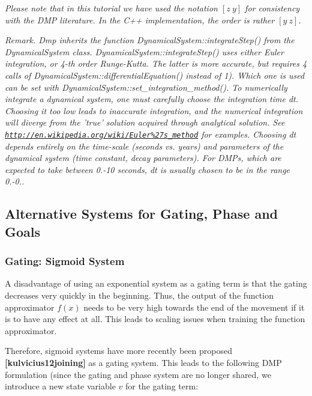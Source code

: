 {\itshape Please note that in this tutorial we have used the notation $[z~y]$ for consistency with the D\+M\+P literature. In the C++ implementation, the order is rather $[y~z]$.}

{\itshape {\itshape Remark}. Dmp inherits the function Dynamical\+System\+::integrate\+Step() from the Dynamical\+System class. Dynamical\+System\+::integrate\+Step() uses either Euler integration, or 4-\/th order Runge-\/\+Kutta. The latter is more accurate, but requires 4 calls of Dynamical\+System\+::differential\+Equation() instead of 1). Which one is used can be set with Dynamical\+System\+::set\+\_\+integration\+\_\+method(). To numerically integrate a dynamical system, one must carefully choose the integration time dt. Choosing it too low leads to inaccurate integration, and the numerical integration will diverge from the 'true' solution acquired through analytical solution. See \href{http://en.wikipedia.org/wiki/Euler%27s_method}{\tt http\+://en.\+wikipedia.\+org/wiki/\+Euler\%27s\+\_\+method} for examples. Choosing dt depends entirely on the time-\/scale (seconds vs. years) and parameters of the dynamical system (time constant, decay parameters). For D\+M\+Ps, which are expected to take between 0.\+5-\/10 seconds, dt is usually chosen to be in the range 0.\+01-\/0.\+001. }\hypertarget{page_dmp_sec_dmp_alternative}{}\subsection{Alternative Systems for Gating, Phase and Goals}\label{page_dmp_sec_dmp_alternative}
\hypertarget{page_dmp_sec_dmp_sigmoid_gating}{}\subsubsection{Gating\+: Sigmoid System}\label{page_dmp_sec_dmp_sigmoid_gating}
A disadvantage of using an exponential system as a gating term is that the gating decreases very quickly in the beginning. Thus, the output of the function approximator $ f(x) $ needs to be very high towards the end of the movement if it is to have any effect at all. This leads to scaling issues when training the function approximator.

Therefore, sigmoid systems have more recently been proposed {\bfseries [kulvicius12joining]} as a gating system. This leads to the following D\+M\+P formulation (since the gating and phase system are no longer shared, we introduce a new state variable $ v $ for the gating term\+:

